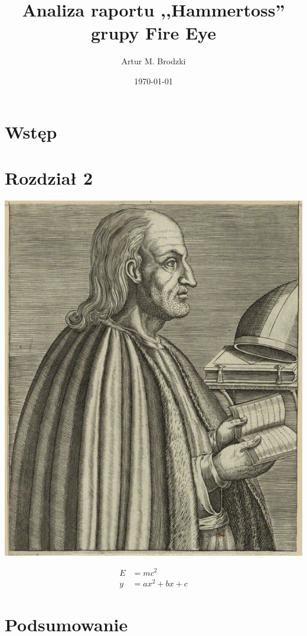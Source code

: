 \documentclass{eiti-raport}
\begin{document}
\author{Artur M. Brodzki}
\date{\today}
\subject{BCYB 2019L}
\title{Analiza raportu ,,Hammertoss'' \\ grupy Fire Eye}

\maketitle


\begin{multicols}{2}

\section{Wstęp} \label{sec:intro}
\lipsum[1-2]

\section{Rozdział 2} \label{sec:2}
\lipsum[3]
\begin{center}
	\label{fig:anzelm}
	\includegraphics[width=0.5\linewidth]{img/anzelm.PNG}
\end{center}
\lipsum[4]
\begin{align*}
E & = m c^2 \\ 
y & = a x^2 + bx + c
\end{align*}
\lipsum[5]

\section{Podsumowanie} \label{sec:summary}
\lipsum[6]


\end{multicols}
\end{document}
